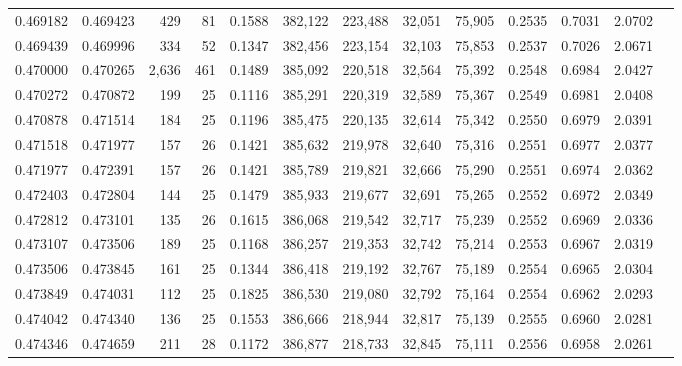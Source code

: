 \begin{tabular}{rrrrrrrrrrrrr}
0.469182 & 0.469423 &   429 &  81 &                                     0.1588 & 382,122 & 223,488 &  32,051 &  75,905 & 0.2535 & 0.7031 & 2.0702 \\
0.469439 & 0.469996 &   334 &  52 &                                     0.1347 & 382,456 & 223,154 &  32,103 &  75,853 & 0.2537 & 0.7026 & 2.0671 \\
0.470000 & 0.470265 & 2,636 & 461 &                                     0.1489 & 385,092 & 220,518 &  32,564 &  75,392 & 0.2548 & 0.6984 & 2.0427 \\
0.470272 & 0.470872 &   199 &  25 &                                     0.1116 & 385,291 & 220,319 &  32,589 &  75,367 & 0.2549 & 0.6981 & 2.0408 \\
0.470878 & 0.471514 &   184 &  25 &                                     0.1196 & 385,475 & 220,135 &  32,614 &  75,342 & 0.2550 & 0.6979 & 2.0391 \\
0.471518 & 0.471977 &   157 &  26 &                                     0.1421 & 385,632 & 219,978 &  32,640 &  75,316 & 0.2551 & 0.6977 & 2.0377 \\
0.471977 & 0.472391 &   157 &  26 &                                     0.1421 & 385,789 & 219,821 &  32,666 &  75,290 & 0.2551 & 0.6974 & 2.0362 \\
0.472403 & 0.472804 &   144 &  25 &                                     0.1479 & 385,933 & 219,677 &  32,691 &  75,265 & 0.2552 & 0.6972 & 2.0349 \\
0.472812 & 0.473101 &   135 &  26 &                                     0.1615 & 386,068 & 219,542 &  32,717 &  75,239 & 0.2552 & 0.6969 & 2.0336 \\
0.473107 & 0.473506 &   189 &  25 &                                     0.1168 & 386,257 & 219,353 &  32,742 &  75,214 & 0.2553 & 0.6967 & 2.0319 \\
0.473506 & 0.473845 &   161 &  25 &                                     0.1344 & 386,418 & 219,192 &  32,767 &  75,189 & 0.2554 & 0.6965 & 2.0304 \\
0.473849 & 0.474031 &   112 &  25 &                                     0.1825 & 386,530 & 219,080 &  32,792 &  75,164 & 0.2554 & 0.6962 & 2.0293 \\
0.474042 & 0.474340 &   136 &  25 &                                     0.1553 & 386,666 & 218,944 &  32,817 &  75,139 & 0.2555 & 0.6960 & 2.0281 \\
0.474346 & 0.474659 &   211 &  28 &                                     0.1172 & 386,877 & 218,733 &  32,845 &  75,111 & 0.2556 & 0.6958 & 2.0261 \\

\end{tabular}
